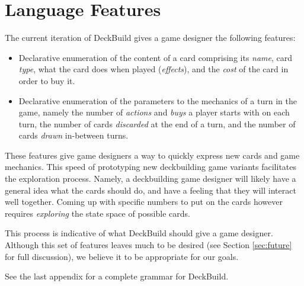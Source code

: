 
\section{Language Features}
\label{sec:features}
The current iteration of DeckBuild gives a game designer the
following features:

\begin{itemize}
\item Declarative enumeration of the content of a card comprising its
      \emph{name}, card \emph{type},
      what the card does when played (\emph{effects}), and the \emph{cost}
      of the card in order to buy it.
\item Declarative enumeration of the parameters to the mechanics of a turn in
      the game, namely the number
      of \emph{actions} and \emph{buys} a player starts with on each turn,
      the number of cards \emph{discarded} at the end of a turn, and the
      number of cards \emph{drawn} in-between turns.
\end{itemize}

These features give game designers a way to quickly express new cards and
game mechanics. This speed of prototyping new deckbuilding game variants
facilitates the exploration process. Namely, a deckbuilding game designer
will likely have a general idea what the cards should do, and have a
feeling that they will interact well together. Coming up with specific
numbers to put on the cards however requires \emph{exploring} the state
space of possible cards.

This process is indicative of what DeckBuild should give a game designer.
Although this set of features leaves much to be desired (see Section
\ref{sec:future} for full discussion), we believe it to be appropriate
for our goals.

See the last appendix for a complete grammar for DeckBuild.

%

